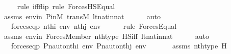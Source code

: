 \begin{isabellebody}
\ \ \ \ \isamarkupfalse%
{\isacharparenleft}{\kern0pt}rule\ iff{\isacharunderscore}{\kern0pt}flip{\isacharcomma}{\kern0pt}\ rule\ ForcesHS{\isacharunderscore}{\kern0pt}Equal{\isacharparenright}{\kern0pt}\isanewline
\ \ \ \ \isamarkupfalse%
\ assms\ envin\ P{\isacharunderscore}{\kern0pt}in{\isacharunderscore}{\kern0pt}M\ transM\ lt{\isacharunderscore}{\kern0pt}nat{\isacharunderscore}{\kern0pt}in{\isacharunderscore}{\kern0pt}nat\isanewline
\ \ \ \ \isamarkupfalse%
\ auto\isanewline
\ \ \isamarkupfalse%
\ \isamarkupfalse%
\ {\isachardoublequoteopen}{\isachardot}{\kern0pt}{\isachardot}{\kern0pt}{\isachardot}{\kern0pt}\ {\isasymlongleftrightarrow}\ forces{\isacharunderscore}{\kern0pt}eq{\isacharparenleft}{\kern0pt}p{\isacharcomma}{\kern0pt}\ nth{\isacharparenleft}{\kern0pt}i{\isacharcomma}{\kern0pt}\ env{\isacharparenright}{\kern0pt}{\isacharcomma}{\kern0pt}\ nth{\isacharparenleft}{\kern0pt}j{\isacharcomma}{\kern0pt}\ env{\isacharparenright}{\kern0pt}{\isacharparenright}{\kern0pt}{\isachardoublequoteclose}\ \isanewline
\ \ \ \ \isamarkupfalse%
{\isacharparenleft}{\kern0pt}rule\ Forces{\isacharunderscore}{\kern0pt}Equal{\isacharparenright}{\kern0pt}\isanewline
\ \ \ \ \isamarkupfalse%
\ assms\ envin\ Forces{\isacharunderscore}{\kern0pt}Member\ nth{\isacharunderscore}{\kern0pt}type\ HS{\isacharunderscore}{\kern0pt}iff\ lt{\isacharunderscore}{\kern0pt}nat{\isacharunderscore}{\kern0pt}in{\isacharunderscore}{\kern0pt}nat\isanewline
\ \ \ \ \isamarkupfalse%
\ auto\isanewline
\ \ \isamarkupfalse%
\ \isamarkupfalse%
\ {\isachardoublequoteopen}{\isachardot}{\kern0pt}{\isachardot}{\kern0pt}{\isachardot}{\kern0pt}\ {\isasymlongleftrightarrow}\ forces{\isacharunderscore}{\kern0pt}eq{\isacharparenleft}{\kern0pt}{\isasympi}{\isacharbackquote}{\kern0pt}p{\isacharcomma}{\kern0pt}\ Pn{\isacharunderscore}{\kern0pt}auto{\isacharparenleft}{\kern0pt}{\isasympi}{\isacharparenright}{\kern0pt}{\isacharbackquote}{\kern0pt}nth{\isacharparenleft}{\kern0pt}i{\isacharcomma}{\kern0pt}\ env{\isacharparenright}{\kern0pt}{\isacharcomma}{\kern0pt}\ Pn{\isacharunderscore}{\kern0pt}auto{\isacharparenleft}{\kern0pt}{\isasympi}{\isacharparenright}{\kern0pt}{\isacharbackquote}{\kern0pt}nth{\isacharparenleft}{\kern0pt}j{\isacharcomma}{\kern0pt}\ env{\isacharparenright}{\kern0pt}{\isacharparenright}{\kern0pt}{\isachardoublequoteclose}\ \isanewline
\ \ \ \ \isamarkupfalse%
\ assms\ nth{\isacharunderscore}{\kern0pt}type\ H\isanewline

\end{isabellebody}
